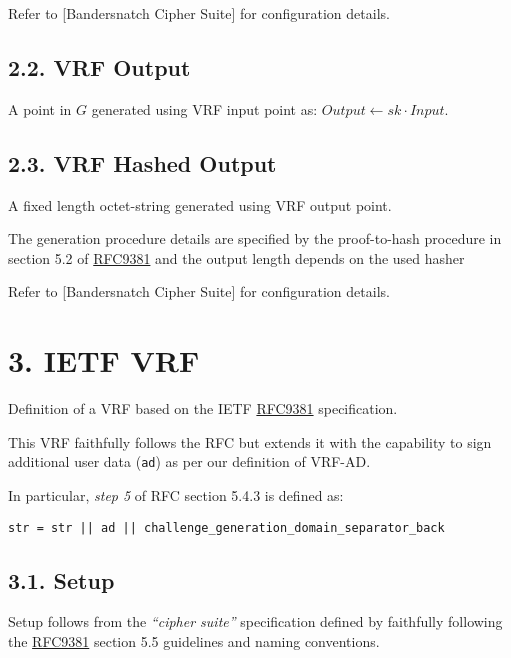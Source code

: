\documentclass[
]{article}
\begin{document}
Refer to {[}Bandersnatch Cipher Suite{]} for configuration details.

\hypertarget{vrf-output}{%
\subsection{2.2. VRF Output}\label{vrf-output}}

A point in \(G\) generated using VRF input point as:
\(Output \leftarrow sk \cdot Input\).

\hypertarget{vrf-hashed-output}{%
\subsection{2.3. VRF Hashed Output}\label{vrf-hashed-output}}

A fixed length octet-string generated using VRF output point.

The generation procedure details are specified by the proof-to-hash
procedure in section 5.2 of
\href{https://datatracker.ietf.org/doc/rfc9381/}{RFC9381} and the output
length depends on the used hasher

Refer to {[}Bandersnatch Cipher Suite{]} for configuration details.

\hypertarget{ietf-vrf}{%
\section{3. IETF VRF}\label{ietf-vrf}}

Definition of a VRF based on the IETF
\href{https://datatracker.ietf.org/doc/rfc9381/}{RFC9381} specification.

This VRF faithfully follows the RFC but extends it with the capability
to sign additional user data (\texttt{ad}) as per our definition of
VRF-AD.

In particular, \emph{step 5} of RFC section 5.4.3 is defined as:

\begin{verbatim}
str = str || ad || challenge_generation_domain_separator_back
\end{verbatim}

\hypertarget{setup}{%
\subsection{3.1. Setup}\label{setup}}

Setup follows from the \emph{``cipher suite''} specification defined by
faithfully following the
\href{https://datatracker.ietf.org/doc/rfc9381/}{RFC9381} section 5.5
guidelines and naming conventions.
\end{document}
